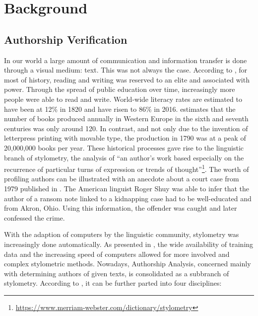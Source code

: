 \chapter{Background}\label{ch:background}
\section{Authorship Verification}\label{sec:authorship-verification}
In our world a large amount of communication and information transfer is done through a visual medium: text.
This was not always the case.
According to \cite{owidliteracy}, for most of history, reading and writing was reserved to an elite and associated with power.
Through the spread of public education over time, increasingly more people were able to read and write.
World-wide literacy rates are estimated to have been at 12\% in 1820 and have risen to 86\% in 2016.
\cite{buringh2009charting} estimates that the number of books produced annually in Western Europe in the sixth and seventh centuries was only around 120.
In contrast, and not only due to the invention of letterpress printing with movable type, the production in 1790 was at a peak of 20,000,000 books per year.
These historical processes gave rise to the linguistic branch of stylometry, the analysis of ``an author's work based especially on the recurrence of particular turns of expression or trends of thought''\footnote{\url{https://www.merriam-webster.com/dictionary/stylometry}}.
The worth of profiling authors can be illustrated with an anecdote about a court case from 1979 published in \cite{hitt2012shuyCase}.
The American linguist Roger Shuy was able to infer that the author of a ransom note linked to a kidnapping case had to be well-educated and from Akron, Ohio.
Using this information, the offender was caught and later confessed the crime.

With the adaption of computers by the linguistic community, stylometry was increasingly done automatically.
As presented in \cite{stamatatos2009survey}, the wide availability of training data and the increasing speed of computers allowed for more involved and complex stylometric methods.
Nowadays, Authorship Analysis, concerned mainly with determining authors of given texts, is consolidated as a subbranch of stylometry.
According to \cite{bevendorff2020shared}, it can be further parted into four disciplines:

